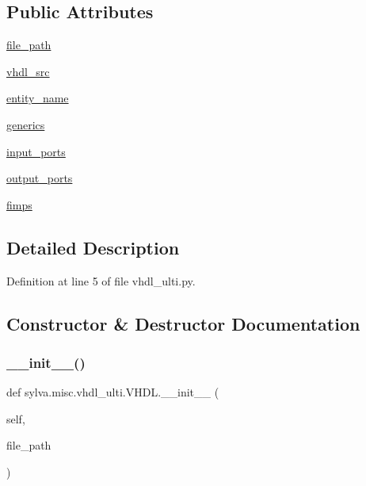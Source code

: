 \subsection*{Public Attributes}
\begin{DoxyCompactItemize}
\item 
\hyperlink{classsylva_1_1misc_1_1vhdl__ulti_1_1_v_h_d_l_a04b9fc97616c0decf89e5bc36fdbf879}{file\+\_\+path}
\item 
\hyperlink{classsylva_1_1misc_1_1vhdl__ulti_1_1_v_h_d_l_a7f2afc1d3df1f99f831393beb2a51e86}{vhdl\+\_\+src}
\item 
\hyperlink{classsylva_1_1misc_1_1vhdl__ulti_1_1_v_h_d_l_a38e49d67a85050815c60101143bb880b}{entity\+\_\+name}
\item 
\hyperlink{classsylva_1_1misc_1_1vhdl__ulti_1_1_v_h_d_l_a8b7f905f643d924262ebabc47433255e}{generics}
\item 
\hyperlink{classsylva_1_1misc_1_1vhdl__ulti_1_1_v_h_d_l_a6c7f99a4fce85a7f4b9824b9ddca3d62}{input\+\_\+ports}
\item 
\hyperlink{classsylva_1_1misc_1_1vhdl__ulti_1_1_v_h_d_l_a6ddcb9779c04889fcb79eca79119600f}{output\+\_\+ports}
\item 
\hyperlink{classsylva_1_1misc_1_1vhdl__ulti_1_1_v_h_d_l_ab91d5a914f4427a54f57ac2945686eca}{fimps}
\end{DoxyCompactItemize}


\subsection{Detailed Description}


Definition at line 5 of file vhdl\+\_\+ulti.\+py.



\subsection{Constructor \& Destructor Documentation}
\mbox{\label{classsylva_1_1misc_1_1vhdl__ulti_1_1_v_h_d_l_a5eac6d4ee2354babf62a07b7f83d94e7}} 
\subsubsection{\texorpdfstring{\+\_\+\+\_\+init\+\_\+\+\_\+()}{\_\_init\_\_()}}
{\footnotesize\ttfamily def sylva.\+misc.\+vhdl\+\_\+ulti.\+V\+H\+D\+L.\+\_\+\+\_\+init\+\_\+\+\_\+ (\begin{DoxyParamCaption}\item[{}]{self,  }\item[{}]{file\+\_\+path }\end{DoxyParamCaption})}



